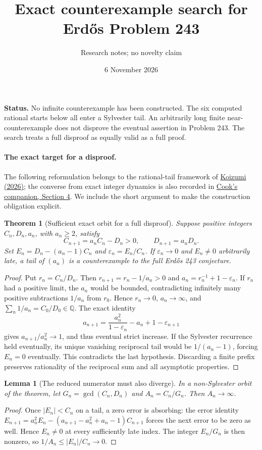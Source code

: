 \documentclass[11pt]{article}
\title{Exact counterexample search for Erd\H{o}s Problem 243}
\author{Research notes; no novelty claim}
\date{6 November 2026}
\newtheorem{theorem}{Theorem}
\newtheorem{lemma}{Lemma}
\begin{document}
\maketitle

\noindent\textbf{Status.} No infinite counterexample has been constructed.
The six computed rational starts below all enter a Sylvester tail.
An arbitrarily long finite near-counterexample does not disprove the
eventual assertion in Problem 243. The search treats a full disproof as
equally valid as a full proof.

\paragraph{The exact target for a disproof.}
The following reformulation belongs to the rational-tail framework of
\href{https://math.colgate.edu/~integers/aa28/aa28.pdf}{Koizumi (2026)};
the converse from exact integer dynamics is also recorded in
\href{https://github.com/wcook04/plectis-erdos/blob/main/paper/243/erdos243-reciprocal-tail-reasoning-surface.tex}{Cook's companion, Section 4}.
We include the short argument to make the construction obligation explicit.

\begin{theorem}[Sufficient exact orbit for a full disproof]
Suppose positive integers $C_n,D_n,a_n$, with $a_n\ge2$, satisfy
\[
 C_{n+1}=a_nC_n-D_n>0,\qquad D_{n+1}=a_nD_n.
\]
Set $E_n=D_n-(a_n-1)C_n$ and $\varepsilon_n=E_n/C_n$.
If $\varepsilon_n\to0$ and $E_n\ne0$ arbitrarily late, a tail of $(a_n)$
is a counterexample to the full Erd\H{o}s 243 conjecture.
\end{theorem}
\begin{proof}
Put $r_n=C_n/D_n$. Then $r_{n+1}=r_n-1/a_n>0$ and
$a_n=r_n^{-1}+1-\varepsilon_n$. If $r_n$ had a positive limit, the
$a_n$ would be bounded, contradicting infinitely many positive subtractions
$1/a_n$ from $r_0$. Hence $r_n\to0$, $a_n\to\infty$, and
$\sum_n1/a_n=C_0/D_0\in\mathbb Q$.
The exact identity
\[
 a_{n+1}=\frac{a_n^2}{1-\varepsilon_n}-a_n+1-\varepsilon_{n+1}
\]
gives $a_{n+1}/a_n^2\to1$, and thus eventual strict increase.
If the Sylvester recurrence held eventually, its unique vanishing
reciprocal tail would be $1/(a_n-1)$, forcing $E_n=0$ eventually.
This contradicts the last hypothesis. Discarding a finite prefix
preserves rationality of the reciprocal sum and all asymptotic properties.
\end{proof}

\begin{lemma}[The reduced numerator must also diverge]
In a non-Sylvester orbit of the theorem, let
$G_n=\gcd(C_n,D_n)$ and $A_n=C_n/G_n$. Then $A_n\to\infty$.
\end{lemma}
\begin{proof}
Once $|E_n|<C_n$ on a tail, a zero error is absorbing: the error identity
$E_{n+1}=a_n^2E_n-(a_{n+1}-a_n^2+a_n-1)C_{n+1}$ forces the next
error to be zero as well. Hence $E_n\ne0$ at every sufficiently late index.
The integer $E_n/G_n$ is then nonzero, so
$1/A_n\le|E_n|/C_n\to0$.
\end{proof}
\end{document}
